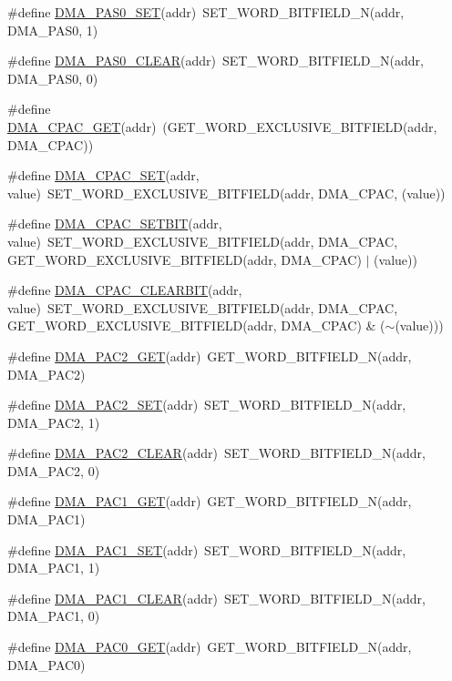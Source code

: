 \begin{DoxyCompactItemize}
\item 
\#define \hyperlink{a00548_a724f2c84929237bd30050d5792de6b37}{DMA\_\-PAS0\_\-SET}(addr)~SET\_\-WORD\_\-BITFIELD\_\-N(addr, DMA\_\-PAS0, 1)
\item 
\#define \hyperlink{a00548_a0dae61123f7a0f7e433c311ea092eac7}{DMA\_\-PAS0\_\-CLEAR}(addr)~SET\_\-WORD\_\-BITFIELD\_\-N(addr, DMA\_\-PAS0, 0)
\item 
\#define \hyperlink{a00548_ad8060272a0870f6e387d3aa46539c841}{DMA\_\-CPAC\_\-GET}(addr)~(GET\_\-WORD\_\-EXCLUSIVE\_\-BITFIELD(addr, DMA\_\-CPAC))
\item 
\#define \hyperlink{a00548_a1d10f528943027cbe1fcc023ba7d1512}{DMA\_\-CPAC\_\-SET}(addr, value)~SET\_\-WORD\_\-EXCLUSIVE\_\-BITFIELD(addr, DMA\_\-CPAC, (value))
\item 
\#define \hyperlink{a00548_a00cee8fe4bce780bd54648a387a77eb9}{DMA\_\-CPAC\_\-SETBIT}(addr, value)~SET\_\-WORD\_\-EXCLUSIVE\_\-BITFIELD(addr, DMA\_\-CPAC, GET\_\-WORD\_\-EXCLUSIVE\_\-BITFIELD(addr, DMA\_\-CPAC) $|$ (value))
\item 
\#define \hyperlink{a00548_a009642cf1c8d8e5fa2c5afbcc9404cad}{DMA\_\-CPAC\_\-CLEARBIT}(addr, value)~SET\_\-WORD\_\-EXCLUSIVE\_\-BITFIELD(addr, DMA\_\-CPAC, GET\_\-WORD\_\-EXCLUSIVE\_\-BITFIELD(addr, DMA\_\-CPAC) \& ($\sim$(value)))
\item 
\#define \hyperlink{a00548_a450a2afb92b982db469cf354c017e5ff}{DMA\_\-PAC2\_\-GET}(addr)~GET\_\-WORD\_\-BITFIELD\_\-N(addr, DMA\_\-PAC2)
\item 
\#define \hyperlink{a00548_a61bffa5c88f1bae12709c82fcdbb3562}{DMA\_\-PAC2\_\-SET}(addr)~SET\_\-WORD\_\-BITFIELD\_\-N(addr, DMA\_\-PAC2, 1)
\item 
\#define \hyperlink{a00548_a03ff670aac2787fa3cd5e166084c536a}{DMA\_\-PAC2\_\-CLEAR}(addr)~SET\_\-WORD\_\-BITFIELD\_\-N(addr, DMA\_\-PAC2, 0)
\item 
\#define \hyperlink{a00548_a47c650006678c017be504ee066ffa5ce}{DMA\_\-PAC1\_\-GET}(addr)~GET\_\-WORD\_\-BITFIELD\_\-N(addr, DMA\_\-PAC1)
\item 
\#define \hyperlink{a00548_ae18810592d235c74b3d396a71786faf9}{DMA\_\-PAC1\_\-SET}(addr)~SET\_\-WORD\_\-BITFIELD\_\-N(addr, DMA\_\-PAC1, 1)
\item 
\#define \hyperlink{a00548_a630b641b9f18deccd59c0578c07e13b2}{DMA\_\-PAC1\_\-CLEAR}(addr)~SET\_\-WORD\_\-BITFIELD\_\-N(addr, DMA\_\-PAC1, 0)
\item 
\#define \hyperlink{a00548_a1dfa2a75850e01863b6391d790c50278}{DMA\_\-PAC0\_\-GET}(addr)~GET\_\-WORD\_\-BITFIELD\_\-N(addr, DMA\_\-PAC0)

\end{DoxyCompactItemize}
